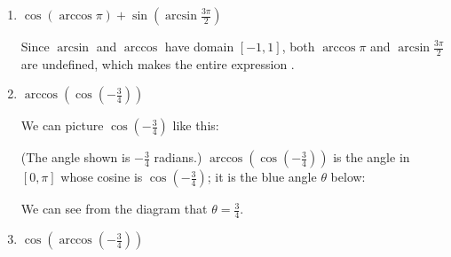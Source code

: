 \documentclass{article}
\begin{document}
\begin{enumerate}
\begin{enumerate}
    \item
      \begin{problem}[\vfill] 
        $ \cos\!\left( \arccos \pi \right) + \sin\!\left(\arcsin
          \frac{3\pi}{2} \right)$
      \end{problem}

      \begin{solution}
        Since $\arcsin$ and $\arccos$ have domain $[-1, 1]$, both $\arccos
        \pi$ and $\arcsin \frac{3\pi}{2}$ are undefined, which makes the
        entire expression .
      \end{solution}

    \item
      \begin{problem}[\vfill]
        $\arccos\!\left( \cos\!\left( - \frac{3}{4} \right) \right)$
      \end{problem}

      \begin{solution}
        We can picture $\cos \left( - \frac{3}{4} \right)$ like this:
        \begin{center}
          \begin{tikzangle}[angle=-3/4, label=$-\frac{3}{4}$, func=cos,
            functick=$\cos \left( - \frac{3}{4} \right)$, width=3in,
            height=3in]            
          \end{tikzangle}
        \end{center}
        (The angle shown is $- \frac{3}{4}$ radians.)  $\arccos \left(
          \cos \left( - \frac{3}{4} \right) \right)$ is the angle in $[0,
        \pi]$ whose cosine is $\cos \left( - \frac{3}{4} \right)$; it is
        the blue angle $\theta$ below:
        \begin{center}
          \begin{tikzangle}[angle=-3/4, label=$-\frac{3}{4}$, func=cos,
            functick=$\cos \left( - \frac{3}{4} \right)$, width=3in,
            height=3in, secondangle=3/4, secondlabel=$\theta$]            
          \end{tikzangle}
        \end{center}
        We can see from the diagram that $\theta = \boxed{\frac{3}{4}}$. 
      \end{solution}

    \item
      \begin{problem}[\vfill]
        $\cos\!\left( \arccos\!\left( - \frac{3}{4} \right) \right)$
      \end{problem}


\end{enumerate}
\end{enumerate}
\end{document}
